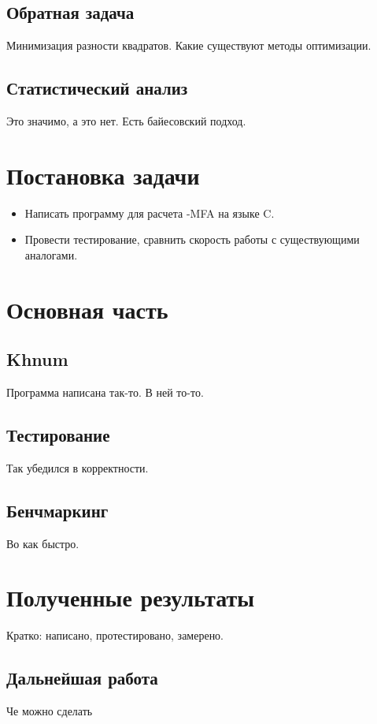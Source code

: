 \documentclass[a4paper, 12pt, left=30mm, right=15mm, top=20mm, bottom=20mm]{report}
\newcommand{\CC}{C\nolinebreak\hspace{-.05em}\raisebox{.4ex}{\tiny\bf +}\nolinebreak\hspace{-.10em}\raisebox{.4ex}{\tiny\bf +}}
\def\CC{{C\nolinebreak[4]\hspace{-.05em}\raisebox{.4ex}{\tiny\bf ++}}} %
\begin{document}
\clearpage
\section{Обратная задача}
Минимизация разности квадратов. Какие существуют методы оптимизации.

\clearpage
\section{Статистический анализ}
Это значимо, а это нет. Есть байесовский подход.

\chapter{Постановка задачи}
\begin{itemize}
	\item Написать программу для расчета -MFA на языке \CC.
	\item Провести тестирование, сравнить скорость работы с существующими аналогами.
\end{itemize}

\chapter{Основная часть}
\section{Khnum}
Программа написана так-то. В ней то-то. 

\section{Тестирование}
Так убедился в корректности.

\section{Бенчмаркинг}
Во как быстро.

\chapter{Полученные результаты}
Кратко: написано, протестировано, замерено.

\section{Дальнейшая работа}
Че можно сделать
\end{document}
